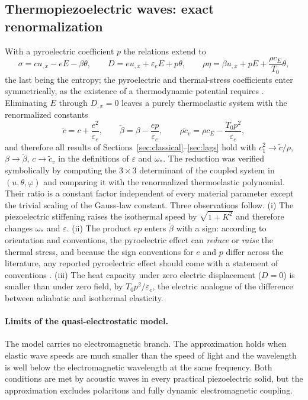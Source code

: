 \subsection{Thermopiezoelectric waves: exact renormalization}
With a pyroelectric coefficient $p$ the relations extend to
\begin{equation}
\sigma=cu_{,x}-eE-\beta\theta,\qquad D=eu_{,x}+\varepsilon_eE+p\theta,\qquad \rho\eta=\beta u_{,x}+pE+\frac{\rho c_E}{T_0}\theta,
\end{equation}
the last being the entropy; the pyroelectric and thermal-stress coefficients enter symmetrically, as the existence of a thermodynamic potential requires \citep{Mindlin1974Thermopiezo,Nowacki1978,Chandrasekharaiah1984}. Eliminating $E$ through $D_{,x}=0$ leaves a purely thermoelastic system with the renormalized constants
\begin{equation}
\tilde c=c+\frac{e^2}{\varepsilon_e},\qquad
\tilde\beta=\beta-\frac{ep}{\varepsilon_e},\qquad
\rho\tilde c_v=\rho c_E-\frac{T_0p^2}{\varepsilon_e},\label{eq:renorm}
\end{equation}
and therefore all results of Sections~\ref{sec:classical}--\ref{sec:lags} hold with $c_1^2\to\tilde c/\rho$, $\beta\to\tilde\beta$, $c\to\tilde c_v$ in the definitions of $\varepsilon$ and $\omega_*$. The reduction was verified symbolically by computing the $3\times3$ determinant of the coupled system in $(u,\theta,\varphi)$ and comparing it with the renormalized thermoelastic polynomial. Their ratio is a constant factor independent of every material parameter except the trivial scaling of the Gauss-law constant. Three observations follow. (i) The piezoelectric stiffening raises the isothermal speed by $\sqrt{1+K^2}$ and therefore changes $\omega_*$ and $\varepsilon$. (ii) The product $ep$ enters $\tilde\beta$ with a sign: according to orientation and conventions, the pyroelectric effect can \emph{reduce} or \emph{raise} the thermal stress, and because the sign conventions for $e$ and $p$ differ across the literature, any reported pyroelectric effect should come with a statement of conventions \citep{Yang2018}. (iii) The heat capacity under zero electric displacement ($D=0$) is smaller than under zero field, by $T_0p^2/\varepsilon_e$, the electric analogue of the difference between adiabatic and isothermal elasticity.

\paragraph{Limits of the quasi-electrostatic model.} The model carries no electromagnetic branch. The approximation holds when elastic wave speeds are much smaller than the speed of light and the wavelength is well below the electromagnetic wavelength at the same frequency. Both conditions are met by acoustic waves in every practical piezoelectric solid, but the approximation excludes polaritons and fully dynamic electromagnetic coupling.

